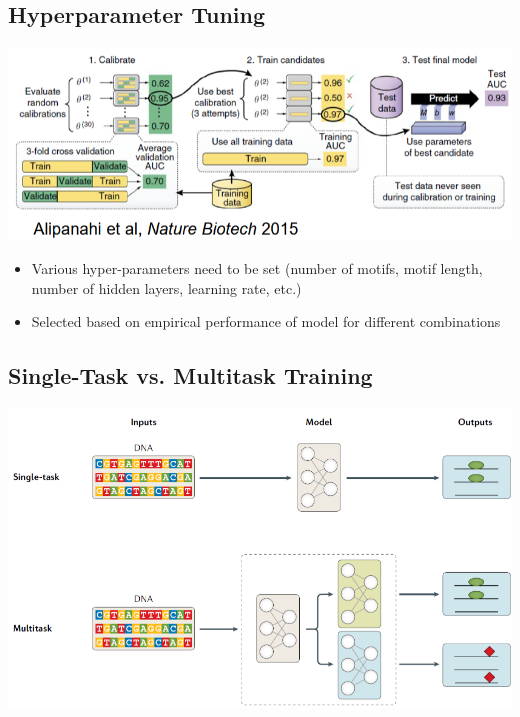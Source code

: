 \documentclass[10pt]{article}
\begin{document}
\subsection*{Hyperparameter Tuning}
\begin{center} 
	\includegraphics*[width=\textwidth]{W8_22.png} 
\end{center}
\begin{itemize}
	\item Various hyper-parameters need to be set (number of motifs, motif length, number of hidden layers, learning rate, etc.)
	\item Selected based on empirical performance of model for different combinations
\end{itemize}

\subsection*{Single-Task vs. Multitask Training}
\begin{center} 
	\includegraphics*[width=\textwidth]{W8_23.png} 
\end{center}
\end{document}
